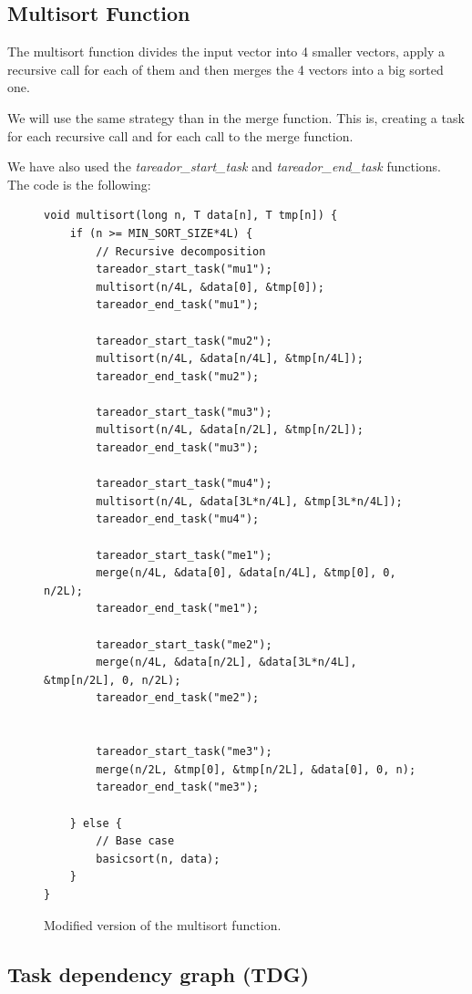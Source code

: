 \documentclass[12pt, a4paper]{article}
\begin{document}
\subsection{Multisort Function}

The multisort function divides the input vector into 4 smaller vectors, apply a recursive call for each of them and then merges the 4 vectors into a big sorted one.

We will use the same strategy than in the merge function. This is, creating a task for each recursive call and for each call to the merge function.

We have also used the \textit{tareador\_start\_task} and \textit{tareador\_end\_task} functions. The code is the following:

\begin{figure}[H]
\begin{lstlisting}
void multisort(long n, T data[n], T tmp[n]) {
    if (n >= MIN_SORT_SIZE*4L) {
        // Recursive decomposition
        tareador_start_task("mu1");
        multisort(n/4L, &data[0], &tmp[0]);
        tareador_end_task("mu1");

        tareador_start_task("mu2");
        multisort(n/4L, &data[n/4L], &tmp[n/4L]);
        tareador_end_task("mu2");

        tareador_start_task("mu3");
        multisort(n/4L, &data[n/2L], &tmp[n/2L]);
        tareador_end_task("mu3");

        tareador_start_task("mu4");
        multisort(n/4L, &data[3L*n/4L], &tmp[3L*n/4L]);
        tareador_end_task("mu4");

        tareador_start_task("me1");
        merge(n/4L, &data[0], &data[n/4L], &tmp[0], 0, n/2L);
        tareador_end_task("me1");

        tareador_start_task("me2");
        merge(n/4L, &data[n/2L], &data[3L*n/4L], &tmp[n/2L], 0, n/2L);
        tareador_end_task("me2");


        tareador_start_task("me3");
        merge(n/2L, &tmp[0], &tmp[n/2L], &data[0], 0, n);
        tareador_end_task("me3");

    } else {
        // Base case
        basicsort(n, data);
    }
}
\end{lstlisting}

\label{code:multisort_tareador}
\caption{Modified version of the multisort function.}
\end{figure}

\subsection{Task dependency graph (TDG)}
\label{subsec:TDG}
\end{document}
